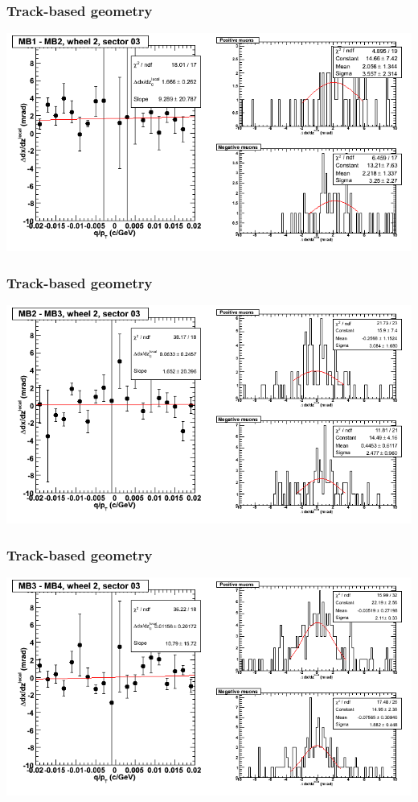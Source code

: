 \documentclass[compress]{beamer}
\begin{document}
\begin{frame}
\frametitle{Track-based geometry}
\includegraphics[width=\linewidth]{NOV4_segdiffs/dt13_slope_E_03_12.png}
\end{frame}

\begin{frame}
\frametitle{Track-based geometry}
\includegraphics[width=\linewidth]{NOV4_segdiffs/dt13_slope_E_03_23.png}
\end{frame}

\begin{frame}
\frametitle{Track-based geometry}
\includegraphics[width=\linewidth]{NOV4_segdiffs/dt13_slope_E_03_34.png}
\end{frame}
\end{document}
